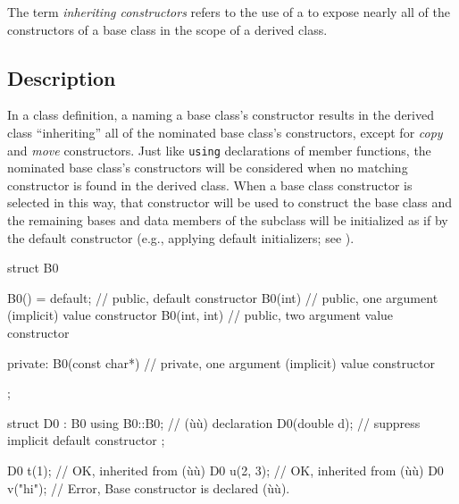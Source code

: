 
\label{inheriting-constructors}
\setcounter{table}{0}
\setcounter{footnote}{0}
\setcounter{lstlisting}{0}



The term \emph{inheriting constructors} refers to the use of a
 to expose nearly all of the
constructors of a base class in the scope of a derived class.

\subsection[Description]{Description}\label{description-inheritingctor}

In a class definition, a  naming a
base class's constructor results in the derived class ``inheriting'' all
of the nominated base class's constructors, except for \emph{copy} and
\emph{move} constructors. Just like \lstinline!using! declarations of member functions, the nominated base class's
constructors will be considered when no matching constructor is found in
the derived class. When a base class constructor is selected in this way,
that constructor will be used to construct the base class and the
remaining bases and data members of the subclass will be initialized as
if by the default constructor (e.g., applying default initializers;
see ).

\begin{emcppslisting}[emcppsbatch=e1]
struct B0
{
    B0() = default;      // public, default constructor
    B0(int)         { }  // public, one argument (implicit) value constructor
    B0(int, int)    { }  // public, two argument value constructor

private:
    B0(const char*) { }  // private, one argument (implicit) value constructor
};

struct D0 : B0
{
    using B0::B0;  // (ù{}ù) declaration
    D0(double d);  // suppress implicit default constructor
};

D0 t(1);     // OK, inherited from (ù{}ù)
D0 u(2, 3);  // OK, inherited from (ù{}ù)
D0 v("hi");  // Error, Base constructor is declared (ù{}ù).
\end{emcppslisting}
    
